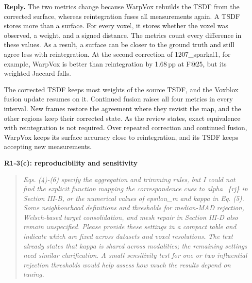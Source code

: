 \documentclass[11pt,a4paper]{article}
\newcommand{\point}[2]{\par\medskip\textbf{#1}\par\begin{quote}\itshape #2\end{quote}}
\newenvironment{reply}{\begingroup\color{replyblue}\textbf{Reply.} }{\par\endgroup}
\begin{document}
\begin{reply}
The two metrics change because WarpVox rebuilds the TSDF from the corrected surface, whereas reintegration fuses all measurements again. A TSDF stores more than a surface. For every voxel, it stores whether the voxel was observed, a weight, and a signed distance. The metrics count every difference in these values. As a result, a surface can be closer to the ground truth and still agree less with reintegration. At the second correction of 1207\_sparkal1, for example, WarpVox is better than reintegration by 1.68\,pp at F@25, but its weighted Jaccard falls.

The corrected TSDF keeps most weights of the source TSDF, and the Voxblox fusion update resumes on it. Continued fusion raises all four metrics in every interval. New frames restore the agreement where they revisit the map, and the other regions keep their corrected state. As the review states, exact equivalence with reintegration is not required. Over repeated correction and continued fusion, WarpVox keeps its surface accuracy close to reintegration, and its TSDF keeps accepting new measurements.
\end{reply}
\point{R1-3(c): reproducibility and sensitivity}{Eqs. (4)-(6) specify the aggregation and trimming rules, but I could not find the explicit function mapping the correspondence cues to alpha\_\{rj\} in Section III-B, or the numerical values of epsilon\_m and kappa in Eq. (5). Some neighbourhood definitions and thresholds for median-MAD rejection, Welsch-based target consolidation, and mesh repair in Section III-D also remain unspecified. Please provide these settings in a compact table and indicate which are fixed across datasets and voxel resolutions. The text already states that kappa is shared across modalities; the remaining settings need similar clarification. A small sensitivity test for one or two influential rejection thresholds would help assess how much the results depend on tuning.}
\end{document}
